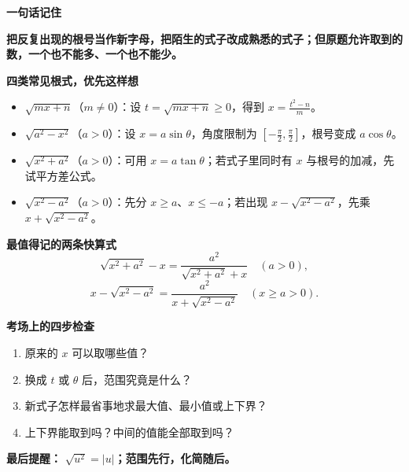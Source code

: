 \clearpage
\begin{summarybox}
  \textbf{\textcolor{CSummary}{一句话记住}}

  \textbf{把反复出现的根号当作新字母，把陌生的式子改成熟悉的式子；但原题允许取到的数，一个也不能多、一个也不能少。}

  \medskip
  \textbf{\textcolor{CSummary}{四类常见根式，优先这样想}}
  \begin{itemize}[leftmargin=*,itemsep=0.45em]
    \item $\sqrt{mx+n}$（$m\ne0$）：设 $t=\sqrt{mx+n}\ge0$，得到 $x=\frac{t^2-n}{m}$。
    \item $\sqrt{a^2-x^2}$（$a>0$）：设 $x=a\sin\theta$，角度限制为 $[-\frac\pi2,\frac\pi2]$，根号变成 $a\cos\theta$。
    \item $\sqrt{x^2+a^2}$（$a>0$）：可用 $x=a\tan\theta$；若式子里同时有 $x$ 与根号的加减，先试平方差公式。
    \item $\sqrt{x^2-a^2}$（$a>0$）：先分 $x\ge a$、$x\le-a$；若出现 $x-\sqrt{x^2-a^2}$，先乘 $x+\sqrt{x^2-a^2}$。
  \end{itemize}

  \medskip
  \textbf{\textcolor{CSummary}{最值得记的两条快算式}}
  \[
    \sqrt{x^2+a^2}-x=\frac{a^2}{\sqrt{x^2+a^2}+x}\quad(a>0),
  \]
  \[
    x-\sqrt{x^2-a^2}=\frac{a^2}{x+\sqrt{x^2-a^2}}
    \quad(x\ge a>0).
  \]

  \medskip
  \textbf{\textcolor{CSummary}{考场上的四步检查}}
  \begin{enumerate}[leftmargin=*,itemsep=0.35em]
    \item 原来的 $x$ 可以取哪些值？
    \item 换成 $t$ 或 $\theta$ 后，范围究竟是什么？
    \item 新式子怎样最省事地求最大值、最小值或上下界？
    \item 上下界能取到吗？中间的值能全部取到吗？
  \end{enumerate}

  \textbf{最后提醒：} \textbf{$\sqrt{u^2}=|u|$；范围先行，化简随后。}
\end{summarybox}
